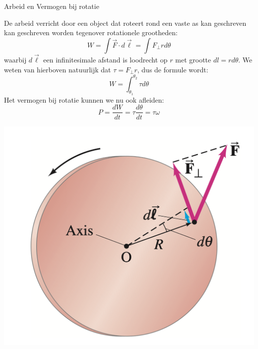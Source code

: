 \begin{app}{Arbeid en Vermogen bij rotatie}
    \begin{minipage}{.66\textwidth}
            De arbeid verricht door een object dat roteert rond een vaste as kan geschreven kan geschreven worden tegenover rotationele grootheden:
            \begin{equation*}
                W = \int \Vec{F} \cdot d\Vec{\ell} = \int F_{\perp}rd\theta
            \end{equation*}
            waarbij $ d\Vec{\ell} $ een infinitesimale afstand is loodrecht op $ r $ met grootte $ dl = rd\theta $. We weten van hierboven natuurlijk dat $ \tau = F_{\perp}r $, dus de formule wordt:
            \begin{equation*}
                W = \int_{\theta_1}^{\theta_2}\tau d\theta
            \end{equation*}
            Het vermogen bij rotatie kunnen we nu ook afleiden:
            \begin{equation*}
                P = \dfrac{dW}{dt} = \tau \dfrac{d\theta}{dt} = \tau \omega
            \end{equation*}
        \end{minipage} 
        \begin{minipage}{.33\textwidth}
            \centering
            \includegraphics[scale = 0.25]{Images/Dynamica/ArbeidBijRotatie.png}
        \end{minipage}
\end{app}

